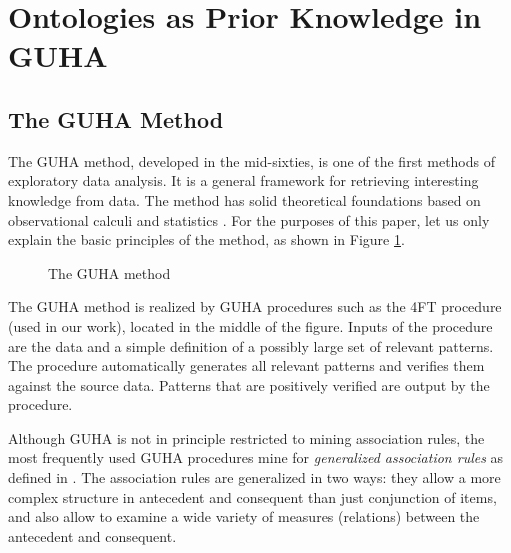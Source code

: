 \section{Ontologies as Prior Knowledge in GUHA} \label{OntologiesAssociation}

\subsection{The GUHA Method}
\label{section:guha}
The GUHA method, developed in the mid-sixties, is one of the first methods of exploratory data analysis. 
It is a general framework for retrieving interesting knowledge from data. 
The method has solid theoretical foundations based on observational calculi and statistics \cite{GUHA}. 
For the purposes of this paper, let us only explain the basic principles of the method, as shown in Figure \ref{fig:GUHA}.

\begin{figure}[ht]
\centering
\mbox{}
\caption{The GUHA method}
\label{fig:GUHA}
\end{figure}

The GUHA method is realized by GUHA procedures such as the 4FT procedure (used in our work), located in the middle of the figure. 
Inputs of the procedure are the data and a simple definition of a possibly large set of relevant patterns. 
The procedure automatically generates all relevant patterns and verifies them against the source data. 
Patterns that are positively verified are output by the procedure.

Although GUHA is not in principle restricted to mining association rules, the most frequently used GUHA procedures mine for \emph{generalized association rules} as defined in \cite{Rauch}. 
The association rules are generalized in two ways: they allow a more complex structure in antecedent and consequent than just conjunction of items, and also allow to examine a wide variety of measures (relations) between the antecedent and consequent.



